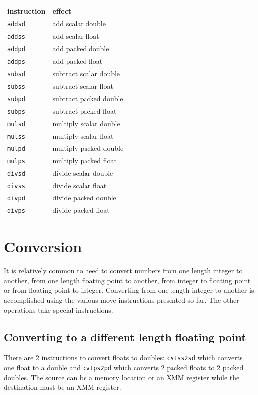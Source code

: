 \documentclass[11pt,b5paper]{book}
\begin{document}
\begin{center}
\begin{tabular}{|l|l|}
\hline
instruction & effect \\
\hline
{\tt addsd} & add scalar double \\
\hline
{\tt addss} & add scalar float \\
\hline
{\tt addpd} & add packed double \\
\hline
{\tt addps} & add packed float \\
\hline
{\tt subsd} & subtract scalar double \\
\hline
{\tt subss} & subtract scalar float \\
\hline
{\tt subpd} & subtract packed double \\
\hline
{\tt subps} & subtract packed float \\
\hline
{\tt mulsd} & multiply scalar double \\
\hline
{\tt mulss} & multiply scalar float \\
\hline
{\tt mulpd} & multiply packed double \\
\hline
{\tt mulps} & multiply packed float \\
\hline
{\tt divsd} & divide scalar double \\
\hline
{\tt divss} & divide scalar float \\
\hline
{\tt divpd} & divide packed double \\
\hline
{\tt divps} & divide packed float \\
\hline
\end{tabular}
\end{center}

\section{Conversion}

It is relatively common to need to convert numbers from one length integer to another, from
one length floating point to another, from integer to floating point or from floating point to
integer.
Converting from one length integer to another is accomplished using the various move instructions
presented so far.
The other operations take special instructions.

\subsection{Converting to a different length floating point}

There are 2 instructions to convert floats to doubles: 
{\tt cvtss2sd} which converts one float to a double and
{\tt cvtps2pd} which converts 2 packed floats to 2 packed doubles.
The source can be a memory location or an XMM register while the destination must be an XMM register.
\end{document}

